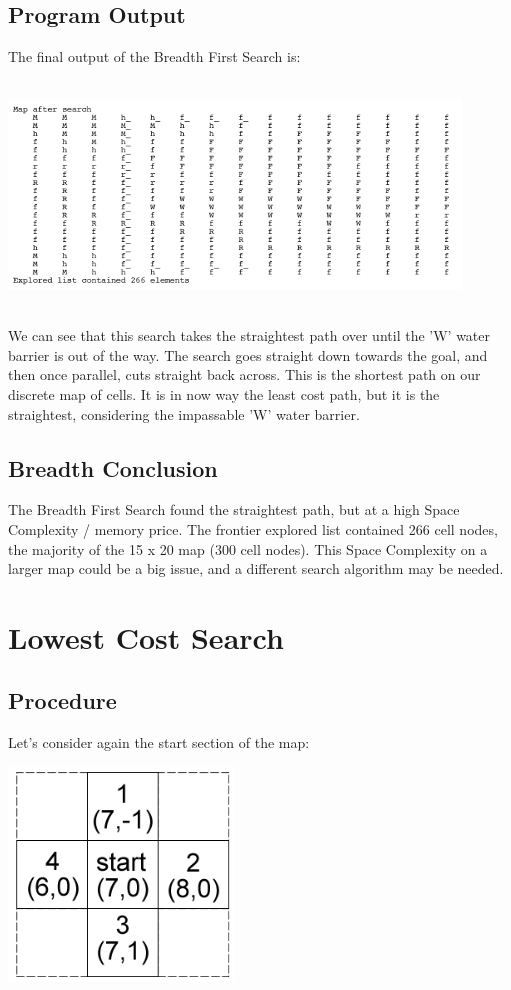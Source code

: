 \documentclass[12pt]{article}
\begin{document}
	\subsection{Program Output}
	The final output of the Breadth First Search is:
	\\
	\begin{center}
		\includegraphics[width=120mm,height=60mm]{images/breadth/final_breadth_map.png}
	\end{center}
	We can see that this search takes the straightest path over until the 'W' water barrier is out of the way. The search goes straight down towards the goal, and then once parallel, cuts straight back across. This is the shortest path on our discrete map of cells. It is in now way the least cost path, but it is the straightest, considering the impassable 'W' water barrier.

	\subsection{Breadth Conclusion}
	The Breadth First Search found the straightest path, but at a high Space Complexity / memory price. The frontier explored list contained 266 cell nodes, the majority of the 15 x 20 map (300 cell nodes). This Space Complexity on a larger map could be a big issue, and a different search algorithm may be needed.


\section{Lowest Cost Search}

	\subsection{Procedure}
	Let's consider again the start section of the map:
	\begin{center} \includegraphics[width=60mm]{images/init_pos.png} \end{center}
\end{document}
